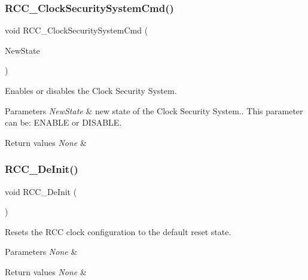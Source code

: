 \subsubsection{\texorpdfstring{RCC\_ClockSecuritySystemCmd()}{RCC\_ClockSecuritySystemCmd()}}
{\footnotesize\ttfamily void R\+C\+C\+\_\+\+Clock\+Security\+System\+Cmd (\begin{DoxyParamCaption}\item[{\mbox{\hyperlink{group___exported__types_gac9a7e9a35d2513ec15c3b537aaa4fba1}{Functional\+State}}}]{New\+State }\end{DoxyParamCaption})}



Enables or disables the Clock Security System. 


\begin{DoxyParams}{Parameters}
{\em New\+State} & new state of the Clock Security System.. This parameter can be\+: E\+N\+A\+B\+LE or D\+I\+S\+A\+B\+LE. \\
\hline
\end{DoxyParams}

\begin{DoxyRetVals}{Return values}
{\em None} & \\
\hline
\end{DoxyRetVals}
\mbox{\label{group___r_c_c___private___functions_ga413f6422be11b1334abe60b3bff2e062}} 
\subsubsection{\texorpdfstring{RCC\_DeInit()}{RCC\_DeInit()}}
{\footnotesize\ttfamily void R\+C\+C\+\_\+\+De\+Init (\begin{DoxyParamCaption}\item[{void}]{ }\end{DoxyParamCaption})}



Resets the R\+CC clock configuration to the default reset state. 


\begin{DoxyParams}{Parameters}
{\em None} & \\
\hline
\end{DoxyParams}

\begin{DoxyRetVals}{Return values}
{\em None} & \\
\hline
\end{DoxyRetVals}
\mbox{\label{group___r_c_c___private___functions_ga3e9944fd1ed734275222bbb3e3f29993}} 
